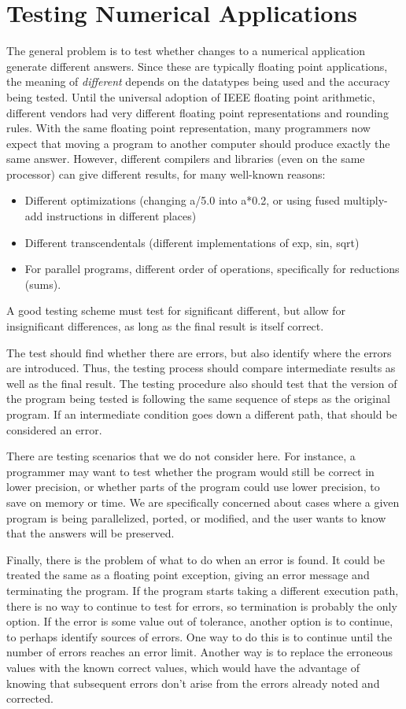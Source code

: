 \section{Testing Numerical Applications}

The general problem is to test whether changes to a numerical application generate different answers.
Since these are typically floating point applications, the meaning of \emph{different} depends on the datatypes being used and the accuracy being tested.
Until the universal adoption of IEEE floating point arithmetic\cite{goldberg.cs.91}, different vendors had very different floating point representations and rounding rules.
With the same floating point representation, many programmers now expect that moving a program to another computer should produce exactly the same answer.
However, different compilers and libraries (even on the same processor) can give different results, for many well-known reasons:
\begin{itemize}
\item Different optimizations (changing a/5.0 into a*0.2, or using fused multiply-add instructions in different places)
\item Different transcendentals (different implementations of exp, sin, sqrt)
\item For parallel programs, different order of operations, specifically for reductions (sums).
\end{itemize}
A good testing scheme must test for significant different, but allow for insignificant differences, as long as the final result is itself correct.

The test should find whether there are errors, but also identify where the errors are introduced.
Thus, the testing process should compare intermediate results as well as the final result.
The testing procedure also should test that the version of the program being tested is following the same sequence of steps as the original program.
If an intermediate condition goes down a different path, that should be considered an error.

There are testing scenarios that we do not consider here.
For instance, a programmer may want to test whether the program would still be correct in lower precision, or whether parts of the program could use lower precision, to save on memory or time.
We are specifically concerned about cases where a given program is being parallelized, ported, or modified, and the user wants to know that the answers will be preserved.

Finally, there is the problem of what to do when an error is found.
It could be treated the same as a floating point exception, giving an error message and terminating the program.
If the program starts taking a different execution path, there is no way to continue to test for errors, so termination is probably the only option.
If the error is some value out of tolerance, another option is to continue, to perhaps identify sources of errors.
One way to do this is to continue until the number of errors reaches an error limit.
Another way is to replace the erroneous values with the known correct values, which would have the advantage of knowing that subsequent errors don't arise from the errors already noted and corrected.


